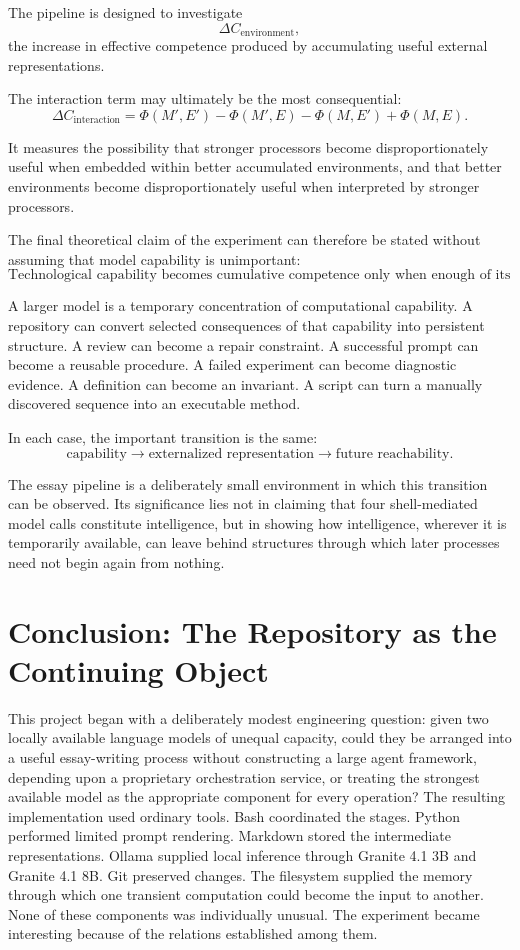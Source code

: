 \documentclass[11pt]{article}
\begin{document}
The pipeline is designed to investigate
\[
    \Delta C_{\mathrm{environment}},
\]
the increase in effective competence produced by accumulating useful external representations.

The interaction term may ultimately be the most consequential:
\[
    \Delta C_{\mathrm{interaction}}
    =
    \Phi(M',E')
    -
    \Phi(M',E)
    -
    \Phi(M,E')
    +
    \Phi(M,E).
\]

It measures the possibility that stronger processors become disproportionately useful when embedded within better accumulated environments, and that better environments become disproportionately useful when interpreted by stronger processors.

The final theoretical claim of the experiment can therefore be stated without assuming that model capability is unimportant:
\[
    \boxed{
    \text{Technological capability becomes cumulative competence only when
    enough of its useful consequences survive into the environment of
    future action.}
    }
\]

A larger model is a temporary concentration of computational capability. A repository can convert selected consequences of that capability into persistent structure. A review can become a repair constraint. A successful prompt can become a reusable procedure. A failed experiment can become diagnostic evidence. A definition can become an invariant. A script can turn a manually discovered sequence into an executable method.

In each case, the important transition is the same:
\[
    \text{capability}
    \longrightarrow
    \text{externalized representation}
    \longrightarrow
    \text{future reachability}.
\]

The essay pipeline is a deliberately small environment in which this transition can be observed. Its significance lies not in claiming that four shell-mediated model calls constitute intelligence, but in showing how intelligence, wherever it is temporarily available, can leave behind structures through which later processes need not begin again from nothing.

\section{Conclusion: The Repository as the Continuing Object}

This project began with a deliberately modest engineering question: given two locally available language models of unequal capacity, could they be arranged into a useful essay-writing process without constructing a large agent framework, depending upon a proprietary orchestration service, or treating the strongest available model as the appropriate component for every operation? The resulting implementation used ordinary tools. Bash coordinated the stages. Python performed limited prompt rendering. Markdown stored the intermediate representations. Ollama supplied local inference through Granite 4.1 3B and Granite 4.1 8B. Git preserved changes. The filesystem supplied the memory through which one transient computation could become the input to another. None of these components was individually unusual. The experiment became interesting because of the relations established among them.
\end{document}
